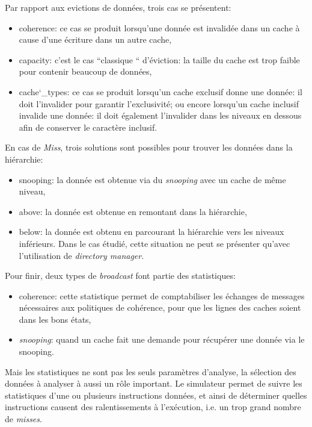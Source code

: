 Par rapport aux evictions de données, trois cas se présentent:
\begin{itemize}
\item coherence: ce cas se produit lorsqu'une donnée est invalidée dans un cache à cause d'une écriture dans un autre cache,
\item capacity: c'est le cas ``classique `` d'éviction: la taille du cache est trop faible pour contenir beaucoup de données,
\item cache\char`_types: ce cas se produit lorsqu'un cache exclusif donne une donnée: il doit l'invalider pour garantir l'exclusivité; ou encore lorsqu'un cache inclusif invalide une donnée: il doit également l'invalider dans les niveaux en dessous afin de conserver le caractère inclusif. \\ 
\end{itemize}

En cas de \emph{Miss}, trois solutions sont possibles pour trouver les données dans la hiérarchie:
\begin{itemize}
\item snooping: la donnée est obtenue via du \emph{snooping} avec un cache de même niveau,
\item above: la donnée est obtenue en remontant dans la hiérarchie,
\item below: la donnée est obtenu en parcourant la hiérarchie vers les niveaux inférieurs. Dans le cas étudié, cette situation ne peut se présenter qu'avec l'utilisation de \emph{directory manager}. \\
\end{itemize}

Pour finir, deux types de \emph{broadcast} font partie des statistiques:
\begin{itemize}
\item coherence: cette statistique permet de comptabiliser les échanges de messages nécessaires aux politiques de cohérence, pour que les lignes des caches soient dans les bons états,
\item \emph{snooping}: quand un cache fait une demande pour récupérer une donnée via le snooping. \\
\end{itemize}


Mais les statistiques ne sont pas les seuls paramètres d'analyse, la sélection des données à analyser à aussi un rôle important. Le simulateur permet de suivre les statistiques d'une ou plusieurs instructions données, et ainsi de déterminer quelles instructions causent des ralentissements à l'exécution, i.e. un trop grand nombre de \emph{misses}.



